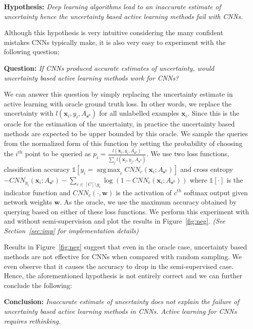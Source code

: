 \documentclass{article}
\DeclareMathOperator*{\argmax}{arg\,max}
\begin{document}
\noindent\textbf{Hypothesis:} \emph{Deep learning algorithms lead to an inaccurate estimate of uncertainty hence the uncertainty based active learning methods fail with CNNs.}

Although this hypothesis is very intuitive considering the many confident mistakes CNNs typically make, it is also very easy to experiment with the following question;

\noindent\textbf{Question:} \emph{If CNNs produced accurate estimates of uncertainty, would uncertainty based active learning methods work for CNNs?}

We can answer this question by simply replacing the uncertainty estimate in active learning with oracle ground truth loss. In other words, we replace the uncertainty with $l(\mathbf{x}_i,y_i,A_{\mathbf{s}^0})$ for all unlabelled examples $\mathbf{x}_i$. Since this is the oracle for the estimation of the uncertainty, in practice the uncertainty based methods are expected to be upper bounded by this oracle. We sample the queries from the normalized form of this function by setting the probability of choosing the $i^{th}$ point to be queried as $p_i=\frac{l(\mathbf{x}_i,y_i,A_{\mathbf{s}^0})}{\sum_j l(\mathbf{x}_j,y_j,A_{\mathbf{s}^0})}$. We use two loss functions, classification accuracy \mbox{$\mathds{1}[y_i = \argmax_c CNN_c(\mathbf{x}_i;A_{\mathbf{s}^0})]$} and cross entropy
\mbox{$ - CNN_{y_i}(\mathbf{x}_i;A_{\mathbf{s}^0}) -\sum_{c \in [C] \setminus y_i} \log(1-  CNN_{c}(\mathbf{x}_i;A_{\mathbf{s}^0}))$} where $\mathds{1}[\cdot]$ is the indicator function and $CNN_c(\cdot,\mathbf{w})$ is the activation of $c^{th}$ softmax output given network weights $\mathbf{w}$. As the oracle, we use the maximum accuracy obtained by querying based on either of these loss functions. We perform this experiment with and without semi-supervision and plot the results in Figure~\ref{fig:neg}. \emph{(See Section~\ref{sec:imp} for implementation details)}

Results in Figure~\ref{fig:neg} suggest that even in the oracle case, uncertainty based methods are not effective for CNNs when compared with random sampling. We even observe that it causes the accuracy to drop in the semi-supervised case. Hence, the aforementioned hypothesis is not entirely correct and we can further conclude the following:

\noindent\textbf{Conclusion:} \emph{Inaccurate estimate of uncertainty does not explain the failure of uncertainty based active learning methods in CNNs. Active learning for CNNs requires rethinking.}
\end{document}
